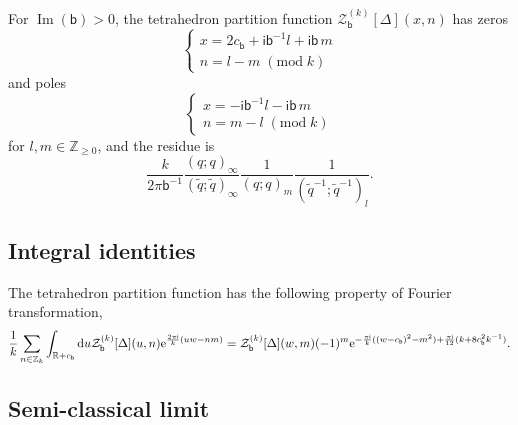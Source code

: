 \documentclass[a4paper,11pt]{article}	%
\DeclareMathOperator{\imag}{Im}
\def\mc{\mathcal}
\def\ms{\mathsf}
\def\IR{\mathbb{R}}
\def\IZ{\mathbb{Z}}
\def\tq{\tilde{q}}
\newcommand{\re}{{\rm e}}
\newcommand{\ri}{{\mathsf{i}}}
\newcommand{\rd}{{\rm d}}
\newcommand{\bb}{\ms{b}}
\begin{document}
For $\imag(\bb) > 0$, the tetrahedron partition function
$\mc{Z}_\bb^{(k)}[\Delta](x,n)$ has zeros
\begin{equation}
  \begin{cases}
    x = 2c_\bb + \ri \bb^{-1} l +\ri \bb\, m\\
    n = l-m \; (\text{mod}\; k)
  \end{cases}
\end{equation}
and poles
\begin{equation}
  \begin{cases}
    x = -\ri \bb^{-1}l - \ri \bb\,m\\
    n = m-l \; (\text{mod}\; k)
  \end{cases}
\end{equation}
for $l,m\in\IZ_{\geq 0}$, and the residue is
\begin{equation}
  \frac{k}{2\pi\bb^{-1}}\frac{(q;q)_\infty}{(\tq;\tq)_\infty}
  \frac{1}{(q;q)_m}\frac{1}{(\tq^{-1};\tq^{-1})_l}.
\end{equation}

\subsection{Integral identities}

The tetrahedron partition function has the following property of
Fourier transformation,
\begin{equation}
  \frac{1}{k}\sum_{n\in\IZ_k}\int_{\IR+c_\bb} \rd u
  \mc{Z}_\bb^{(k)}[\Delta](u,n)\re^{\frac{2\pi\ri}{k}(uw-nm)}
  =\mc{Z}_\bb^{(k)}[\Delta](w,m)(-1)^m
  \re^{-\frac{\pi\ri}{k}((w-c_{\bb})^2-m^2)+\frac{\pi\ri}{12}
    (k+8c_{\bb}^2 k^{-1})}.
  \label{eq:FourierFQD}
\end{equation}

\subsection{Semi-classical limit}
\end{document}
